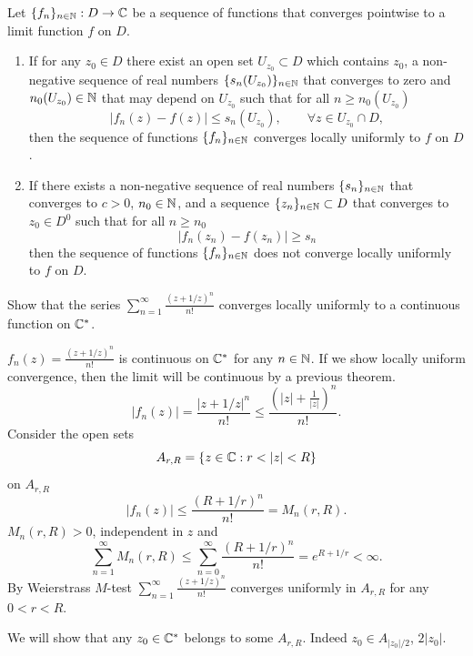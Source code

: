 \documentclass[10pt, a4paper]{article}
\begin{document}
\begin{lemma}
    Let $\{f_n\}_{n \in \mathbb{N}} : D \to \mathbb{C}$ be a sequence of functions that converges pointwise to a limit function $f$ on $D$.

    \begin{enumerate}[label = (\roman*)]
        \item If for any $z_0 \in D$ there exist an open set $U_{z_0} \subset D$ which contains $z_0$,
        a non-negative sequence of real numbers $\{s_n(U_{z_0})\}_{n \in \mathbb{N}}$ that converges to zero and $n_0(U_{z_0}) \in \mathbb{N}$ that may depend on $U_{z_0}$ such that for all $n \geq n_0(U_{z_0})$
        \[
        |f_n(z) - f(z)| \leq s_n(U_{z_0}),\qquad \forall z \in U_{z_0} \cap D,
        \]
        then the sequence of functions $\{f_n\}_{n \in \mathbb{N}}$ converges locally uniformly to $f$ on $D$.

        \item If there exists a non-negative sequence of real numbers $\{s_n\}_{n \in \mathbb{N}}$ that converges to $c > 0$,
        $n_0 \in \mathbb{N}$,
        and a sequence $\{z_n\}_{n \in \mathbb{N}} \subset D$ that converges to $z_0 \in D ^ 0$ such that for all $n \geq n_0$
        \[
        |f_n(z_n) - f(z_n)| \geq s_n
        \]
        then the sequence of functions $\{f_n\}_{n \in \mathbb{N}}$ does not converge locally uniformly to $f$ on $D$.
    \end{enumerate}
\end{lemma}

\begin{example}
    Show that the series $\sum_{n = 1}^{\infty}\frac{(z + 1 / z) ^ n}{n!}$ converges locally uniformly to a continuous function on $\mathbb{C} ^ {*}$.

    \begin{solution}
        $f_n(z) = \frac{(z + 1 / z) ^ n}{n!}$ is continuous on $\mathbb{C} ^ {*}$ for any $n \in \mathbb{N}$.
        If we show locally uniform convergence,
        then the limit will be continuous by a previous theorem.
        \[
        |f_n(z)| = \frac{|z + 1 / z| ^ n}{n!} \leq \frac{\left(|z| + \frac{1}{|z|}\right) ^ n}{n!}.
        \]
        Consider the open sets
        \[
        A_{r, R} = \{z \in \mathbb{C} : r < |z| < R\}
        \]
        on $A_{r, R}$
        \[
        |f_n(z)| \leq \frac{(R + 1 / r) ^ n}{n!} = M_n(r, R).
        \]
        $M_n(r, R) > 0$,
        independent in $z$ and
        \[
        \sum_{n = 1}^{\infty}M_n(r, R) \leq \sum_{n = 0}^{\infty}\frac{(R + 1 / r) ^ n}{n!} = e ^ {R + 1 / r} < \infty.
        \]
        By Weierstrass $M$-test $\sum_{n = 1}^{\infty}\frac{(z + 1 / z) ^ n}{n!}$ converges uniformly in $A_{r, R}$ for any $0 < r < R$.

        We will show that any $z_0 \in \mathbb{C} ^ {*}$ belongs to some $A_{r, R}$.
        Indeed $z_0 \in A_{|z_0| / 2}$,
        $2|z_0|$.
    \end{solution}
\end{example}
\end{document}
